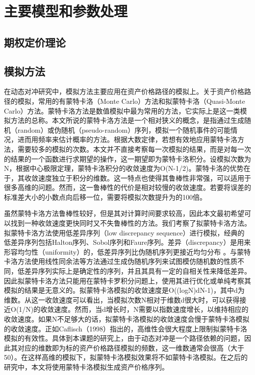 
\chapter{主要模型和参数处理}
\label{chap:bib}

\section{期权定价理论}

\section{模拟方法}

在动态对冲研究中，模拟方法主要应用在资产价格路径的模拟上。关于资产价格路径的模拟，常用的有蒙特卡洛（Monte Carlo）方法和拟蒙特卡洛（Quasi-Monte Carlo）方法。蒙特卡洛方法是数值模拟中最为常用的方法，它实际上是这一类模拟方法的总称。本文所说的蒙特卡洛方法是一个相对狭义的概念，是指通过生成随机（random）或伪随机（pseudo-random）序列，模拟一个随机事件的可能情况，进而用频率来估计概率的方法。根据大数定律，若想有效地应用蒙特卡洛方法，需要较多的模拟的次数。本文并不直接考察每一次模拟的结果，而是对每一次的结果的一个函数进行求期望的操作，这一期望即为蒙特卡洛积分。设模拟次数为N，根据中心极限定理，蒙特卡洛积分的收敛速度为O(N-1/2)。蒙特卡洛的优势在于，其收敛速度独立于积分的维数。这一特点也使得其鲁棒性非常强，可以适用于很多高维的问题。然而，这一鲁棒性的代价是相对较慢的收敛速度。若要将误差的标准差大小的小数点向后移一位，需要将模拟次数提升为的100倍。

虽然蒙特卡洛方法鲁棒性较好，但是其对计算时间要求较高，因此本文最初希望可以找到一种收敛速度更快同时又不失鲁棒性的方法。我们考察了拟蒙特卡洛方法。拟蒙特卡洛方法使用低差异序列（low discrepancy sequence）进行模拟，经典的低差异序列包括Halton序列、Sobol序列和Faure序列。差异（discrepancy）是用来形容均匀性（uniformity）的，低差异序列比伪随机序列更接近均匀分布 。与蒙特卡洛方法使用线性同余法等方法通过生成伪随机序列来试图模仿随机数的性质不同，低差异序列实际上是确定性的序列，并且其具有一定的自相关性来降低差异。因此拟蒙特卡洛方法只能用在蒙特卡罗积分问题上，使用其进行优化或单纯考察其模拟的结果是无意义的。拟蒙特卡洛模拟的收敛速度是O((logN)dN-1)，其中d为维数。从这一收敛速度可以看出，当模拟次数N相对于维数d很大时，可以获得接近O(1/N)的收敛速度。然而，当d增长时，N需要以指数速度增长，以维持相应的收敛速度。如果N不足够大的话，拟蒙特卡洛模拟的收敛速度会慢于蒙特卡洛模拟的收敛速度。正如Caflisch（1998）指出的，高维性会很大程度上限制拟蒙特卡洛模拟的有效性。具体到本课题的研究上，由于动态对冲是一个路径依赖的问题，因此其对应的维数即为标的资产价格路径模拟的频数，这一维数通常会很高（大于50）。在这样高维的模拟下，拟蒙特卡洛模拟效果将不如蒙特卡洛模拟。在之后的研究中，本文将使用蒙特卡洛模拟生成资产价格序列。

